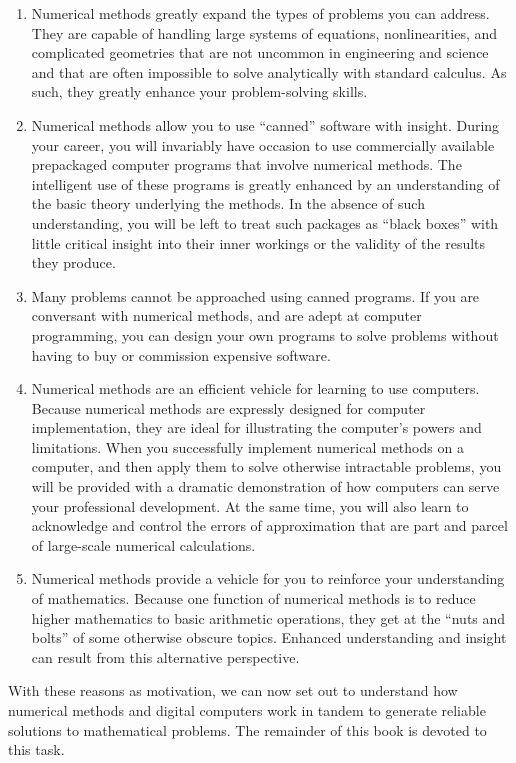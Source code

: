 \documentclass[../main.tex]{subfiles}
\begin{document}
\begin{enumerate}
\item Numerical methods greatly expand the
types of problems you can address. They
are capable of handling large systems of
equations, nonlinearities, and complicated geometries that are not uncommon
in engineering and science and that are
often impossible to solve analytically
with standard calculus. As such, they
greatly enhance your problem-solving
skills.
\item Numerical methods allow you to use
“canned” software with insight. During your career, you will invariably have occasion to use commercially available prepackaged computer programs that involve numerical methods. The intelligent use of these
programs is greatly enhanced by an understanding of the basic theory underlying the
methods. In the absence of such understanding, you will be left to treat such packages
as “black boxes” with little critical insight into their inner workings or the validity of
the results they produce.
\item Many problems cannot be approached using canned programs. If you are conversant
with numerical methods, and are adept at computer programming, you can design
your own programs to solve problems without having to buy or commission expensive
software.
\item Numerical methods are an efficient vehicle for learning to use computers. Because numerical methods are expressly designed for computer implementation, they are ideal for
illustrating the computer’s powers and limitations. When you successfully implement
numerical methods on a computer, and then apply them to solve otherwise intractable
problems, you will be provided with a dramatic demonstration of how computers can
serve your professional development. At the same time, you will also learn to acknowledge and control the errors of approximation that are part and parcel of large-scale
numerical calculations.
\item
Numerical methods provide a vehicle for you to reinforce your understanding of mathematics. Because one function of numerical methods is to reduce higher mathematics
to basic arithmetic operations, they get at the “nuts and bolts” of some otherwise
obscure topics. Enhanced understanding and insight can result from this alternative
perspective.
\end{enumerate}

With these reasons as motivation, we can now set out to understand how numerical
methods and digital computers work in tandem to generate reliable solutions to mathematical problems. The remainder of this book is devoted to this task.
\end{document}
